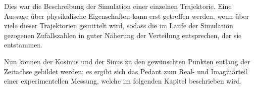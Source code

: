 Dies war die Beschreibung der Simulation einer einzelnen Trajektorie. Eine Aussage über physikalische Eigenschaften kann erst getroffen werden, wenn über viele dieser Trajektorien gemittelt wird, sodass die im Laufe der Simulation gezogenen Zufallszahlen in guter Näherung der Verteilung entsprechen, der sie entstammen.

Nun können der Kosinus und der Sinus zu den gewünschten Punkten entlang der Zeitachse gebildet werden; es ergibt sich das Pedant zum Real- und Imaginärteil einer experimentellen Messung, welche im folgenden Kapitel beschrieben wird.
